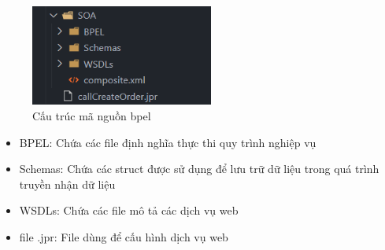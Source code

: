\begin{figure}[!htp]
    \begin{center}
        \includegraphics[width=6cm]{img/file-structure/bpel.png}
    \end{center}
    \caption{Cấu trúc mã nguồn bpel}
\end{figure}

\begin{itemize}
    \item BPEL: Chứa các file định nghĩa thực thi quy trình nghiệp vụ
    \item Schemas: Chứa các struct được sử dụng để lưu trữ dữ liệu trong quá trình truyền nhận dữ liệu
    \item WSDLs: Chứa các file mô tả các dịch vụ web
    \item file .jpr: File dùng để cấu hình dịch vụ web
\end{itemize}